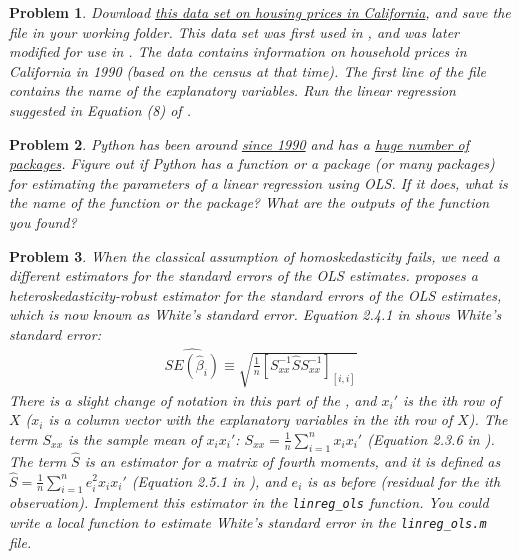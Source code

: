 \documentclass[12pt, a4paper]{article}
\newtheorem{problem}{Problem}
\begin{document}
\begin{problem}
Download \href{https://raw.githubusercontent.com/Salompas/handson-ml/master/datasets/housing/housing.csv}{this data set on housing prices in California}, and save the file in your working folder.
This data set was first used in \citet{PB1997}, and was later modified for use in \citet{G2017}.
The data contains information on household prices in California in 1990 (based on the census at that time).
The first line of the file contains the name of the explanatory variables.
Run the linear regression suggested in Equation (8) of \citet{PB1997}.
\end{problem}

\begin{problem}
Python has been around \href{https://en.wikipedia.org/wiki/Python\_(programming\_language)}{since 1990} and has a \href{https://pypi.org}{huge number of packages}.
Figure out if Python has a function or a package (or many packages) for estimating the parameters of a linear regression using OLS.
If it does, what is the name of the function or the package?
What are the outputs of the function you found?
\end{problem}

\begin{problem}
When the classical assumption of homoskedasticity fails, we need a different estimators for the standard errors of the OLS estimates.
\citet{W1980} proposes a heteroskedasticity-robust estimator for the standard errors of the OLS estimates, which is now known as White's standard error.
Equation 2.4.1 in \citet{H2000} shows White's standard error:
\begin{align*}
\widehat{SE(\hat{\beta}_i)}\equiv\sqrt{\frac{1}{n}[S_{xx}^{-1}\hat{S}S_{xx}^{-1}]_{[i,i]}}
\end{align*}
There is a slight change of notation in this part of the \citet{H2000}, and \(x_i'\) is the ith row of \(X\) (\(x_i\) is a column vector with the explanatory variables in the ith row of \(X\)).
The term \(S_{xx}\) is the sample mean of \(x_ix_i'\): \(S_{xx}=\frac{1}{n}\sum_{i=1}^nx_ix_i'\) (Equation 2.3.6 in \citet{H2000}).
The term \(\hat{S}\) is an estimator for a matrix of fourth moments, and it is defined as \(\hat{S}=\frac{1}{n}\sum_{i=1}^ne_i^2x_ix_i'\) (Equation 2.5.1 in \citet{H2000}), and \(e_i\) is as before (residual for the ith observation).
Implement this estimator in the \texttt{linreg\_ols} function.
You could write a local function to estimate White's standard error in the \texttt{linreg\_ols.m} file.
\end{problem}
\end{document}
